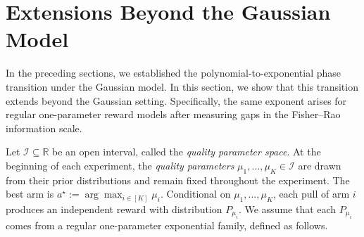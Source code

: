 \documentclass[10pt]{article}
\newcommand{\dd}{\mathrm{d}}
\theoremstyle{plain}
\begin{document}
\section{Extensions Beyond the Gaussian Model}
\label{sec:generalization}

 
In the preceding sections, we established the polynomial-to-exponential phase transition under the Gaussian  model. In this section, we show that this transition extends beyond the Gaussian setting. 
Specifically, the same exponent arises for regular one-parameter reward models after measuring
gaps in the   Fisher--Rao information scale.




Let \(\mathcal I\subseteq\mathbb R\) be an open interval, called the \emph{quality parameter space}. At the beginning of each experiment, the \emph{quality parameters} \(\mu_1,\ldots,\mu_K\in\mathcal I\) are drawn from their prior distributions and remain fixed throughout the experiment. The best arm is $a^\star:=\arg\max_{i\in[K]}\mu_i$.
Conditional on \(\mu_1, \ldots, \mu_K \), each pull of arm \(i\) produces an independent reward with distribution \(P_{\mu_i}\). We assume that each $P_{\mu_i}$ comes from a regular one-parameter exponential family, defined as follows. 
\end{document}
